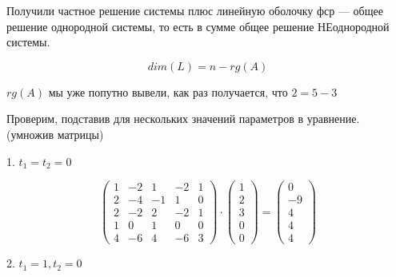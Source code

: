 \documentclass[12pt, a4paper]{article}
\begin{document}
    Получили частное решение системы плюс линейную оболочку фср — общее решение однородной системы, 
    то есть в сумме общее решение НЕоднородной системы. 

    \begin{equation}
        dim(L) = n - rg(A)
    \end{equation}

    $rg(A)$ мы уже попутно вывели, как раз получается, что $2 = 5 - 3$

    Проверим, подставив для нескольких значений параметров в уравнение. (умножив матрицы)

    1. $t_1 = t_2 = 0$

    \begin{equation}
        \left(\begin{matrix}
            1 & -2 & 1 & -2 & 1 \\
            2 & -4 & -1 & 1 & 0 \\
            2 & -2 & 2 & -2 & 1 \\
            1 & 0 & 1 & 0 & 0 \\
            4 & -6 & 4 & -6 & 3
        \end{matrix}\right) \cdot \left(\begin{matrix}
            1 \\
            2 \\
            3 \\
            0 \\
            0
        \end{matrix}\right) =\left(\begin{matrix}
            0 \\
            -9 \\
            4 \\
            4 \\
            4
        \end{matrix}\right)
    \end{equation}

    2. $t_1 = 1, t_2 = 0$
\end{document}
